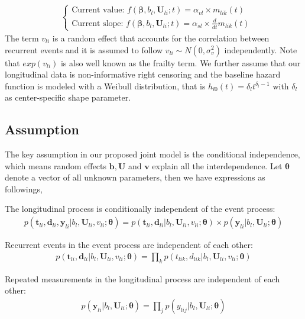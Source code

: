 \begin{align}
&  \left \{\begin{array}{ll}
 \mbox{Current value: }f(\bm{\beta}, b_l, \bm{U}_{li}; t)=\alpha_{vl} \times m_{lik}(t)\\
 \mbox{Current slope: }f(\bm{\beta}, b_l, \bm{U}_{li}; t)=\alpha_{sl} \times \frac{d}{dt} m_{lik}(t)
\end{array}\right.
\end{align}
The term $v_{li}$ is a random effect that accounts for the correlation between recurrent events and it is assumed to follow $v_{li} \sim N(0,\sigma^2_v)$  independently. Note that $exp(v_{li})$ is also well known as the frailty term. We further assume that our longitudinal data is non-informative right censoring and the baseline hazard function is modeled with a Weibull distribution, that is $h_{l0}(t)=\delta_l t^{\delta_l-1}$ with $\delta_l$ as center-specific shape parameter. 

\subsection{Assumption}

The key assumption in our proposed joint model is the conditional independence, which means random effects $\bm{b},\bm{U}$ and $\bm{v}$ explain all the interdependence. Let $\bm{\theta}$ denote a vector of all unknown parameters, then we have expressions as followings, 


The longitudinal process is conditionally independent of the event process:
\begin{align}
   p(\bm{t}_{li},\bm{d}_{li},\bm{y}_{li}|b_l,\bm{U}_{li},v_{li};\bm{\theta})=p(\bm{t}_{li},\bm{d}_{li}|b_l,\bm{U}_{li},v_{li};\bm{\theta}) \times p(\bm{y}_{li}|b_l,\bm{U}_{li};\bm{\theta}) 
\end{align}

Recurrent events in the event process are independent of each other: 
\begin{align}
    p(\bm{t}_{li},\bm{d}_{li}|b_l,\bm{U}_{li}, v_{li};\bm{\theta})=\prod_k p(t_{lik},d_{lik}|b_l,\bm{U}_{li},v_{li};\bm{\theta})
\end{align}

Repeated measurements in the longitudinal process are independent of each other: 
\begin{align}
  p(\bm{y}_{li}|b_l,\bm{U}_{li};\bm{\theta})=\prod_j p(y_{lij}|b_l,\bm{U}_{li};\bm{\theta})  
\end{align}

